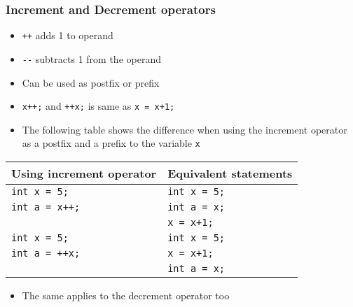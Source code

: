 \documentclass[11pt]{beamer}
\begin{document}
\begin{frame}[fragile]\frametitle{Increment and Decrement operators}
\label{sec-1-19}

\begin{itemize}
\item \verb~++~ adds 1 to operand
\item \verb~--~ subtracts 1 from the operand
\item Can be used as postfix or prefix
\item \verb~x++;~ and \verb~++x;~ is same as \verb~x = x+1;~
\item The following table shows the difference when using the increment operator as a postfix and a prefix to the variable \verb~x~
\end{itemize}

\begin{center}
\begin{tabular}{|p{5cm}|l|}
\hline
 Using increment operator  &  Equivalent statements  \\
\hline
 \verb~int x = 5;~         &  \verb~int x = 5;~      \\
 \verb~int a = x++;~       &  \verb~int a = x;~      \\
                           &  \verb~x = x+1;~        \\
\hline
 \verb~int x = 5;~         &  \verb~int x = 5;~      \\
 \verb~int a = ++x;~       &  \verb~x = x+1;~        \\
                           &  \verb~int a = x;~      \\
\hline
\end{tabular}
\end{center}


\begin{itemize}
\item The same applies to the decrement operator too
\end{itemize}
\end{frame}
\end{document}
